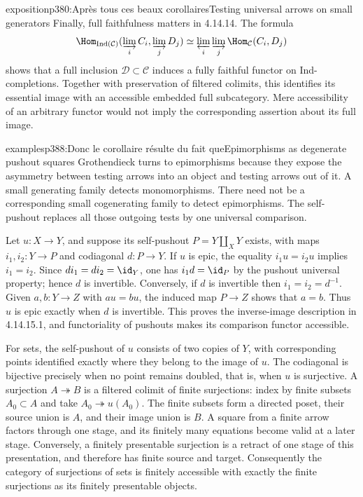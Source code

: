 \begin{dcomment}{exposition}{p380:Après tous ces beaux corollaires}{Testing universal arrows on small generators}
Finally, full faithfulness matters in 4.14.14. The formula
\[
 \Hom_{\operatorname{Ind}(\mathcal C)}
    (\varinjlim_iC_i,\varinjlim_jD_j)
 \simeq\varprojlim_i\varinjlim_j\Hom_{\mathcal C}(C_i,D_j)
\]
shows that a full inclusion $\mathcal D\subset\mathcal C$ induces a fully faithful functor on Ind-completions. Together with preservation of filtered colimits, this identifies its essential image with an accessible embedded full subcategory. Mere accessibility of an arbitrary functor would not imply the corresponding assertion about its full image.
\end{dcomment}

\begin{dcomment}{examples}{p388:Donc le corollaire résulte du fait que}{Epimorphisms as degenerate pushout squares}
Grothendieck turns to epimorphisms because they expose the asymmetry between testing arrows into an object and testing arrows out of it. A small generating family detects monomorphisms. There need not be a corresponding small cogenerating family to detect epimorphisms. The self-pushout replaces all those outgoing tests by one universal comparison.

Let $u:X\to Y$, and suppose its self-pushout $P=Y\amalg_XY$ exists, with maps $i_1,i_2:Y\to P$ and codiagonal $d:P\to Y$. If $u$ is epic, the equality $i_1u=i_2u$ implies $i_1=i_2$. Since $di_1=di_2=\id_Y$, one has $i_1d=\id_P$ by the pushout universal property; hence $d$ is invertible. Conversely, if $d$ is invertible then $i_1=i_2=d^{-1}$. Given $a,b:Y\to Z$ with $au=bu$, the induced map $P\to Z$ shows that $a=b$. Thus $u$ is epic exactly when $d$ is invertible. This proves the inverse-image description in 4.14.15.1, and functoriality of pushouts makes its comparison functor accessible.

For sets, the self-pushout of $u$ consists of two copies of $Y$, with corresponding points identified exactly where they belong to the image of $u$. The codiagonal is bijective precisely when no point remains doubled, that is, when $u$ is surjective. A surjection $A\twoheadrightarrow B$ is a filtered colimit of finite surjections: index by finite subsets $A_0\subset A$ and take $A_0\twoheadrightarrow u(A_0)$. The finite subsets form a directed poset, their source union is $A$, and their image union is $B$. A square from a finite arrow factors through one stage, and its finitely many equations become valid at a later stage. Conversely, a finitely presentable surjection is a retract of one stage of this presentation, and therefore has finite source and target. Consequently the category of surjections of sets is finitely accessible with exactly the finite surjections as its finitely presentable objects.


\end{dcomment}

